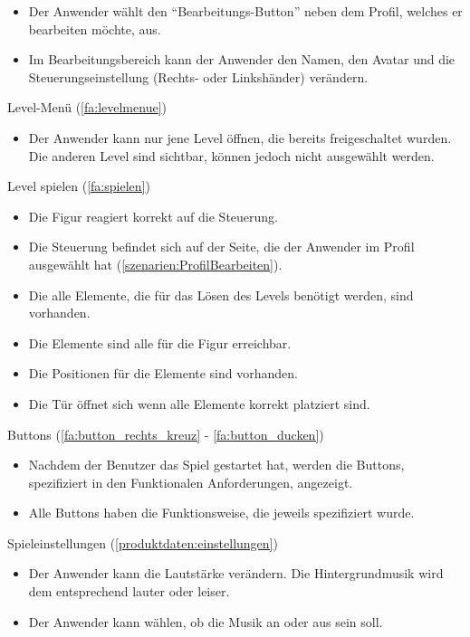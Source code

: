 \documentclass{scrartcl}
\begin{document}
\begin{telist}
\begin{itemize}
		\item Der Anwender wählt den \enquote{Bearbeitungs-Button} neben dem Profil, welches er bearbeiten möchte, aus.
		\item Im Bearbeitungsbereich kann der Anwender den Namen, den Avatar und die Steuerungseinstellung (Rechts- oder Linkshänder) verändern.
	\end{itemize}
	\item Level-Menü (\ref{fa:levelmenue})
	\begin{itemize}
		\item Der Anwender kann nur jene Level öffnen, die bereits freigeschaltet wurden. Die anderen Level sind sichtbar, können jedoch nicht ausgewählt werden.
	\end{itemize}
	\item Level spielen (\ref{fa:spielen})
	\begin{itemize}
		\item Die Figur reagiert korrekt auf die Steuerung.
		\item Die Steuerung befindet sich auf der Seite, die der Anwender im Profil ausgewählt hat (\ref{szenarien:ProfilBearbeiten}).
		\item Die alle Elemente, die für das Lösen des Levels benötigt werden, sind vorhanden.
		\item Die Elemente sind alle für die Figur erreichbar.
		\item Die Positionen für die Elemente sind vorhanden.
		\item Die Tür öffnet sich wenn alle Elemente korrekt platziert sind.
	\end{itemize}
	\item Buttons (\ref{fa:button_rechts_kreuz} - \ref{fa:button_ducken})
	\begin{itemize}
		\item Nachdem der Benutzer das Spiel gestartet hat, werden die Buttons, spezifiziert in den Funktionalen Anforderungen, angezeigt.
		\item Alle Buttons haben die Funktionsweise, die jeweils spezifiziert wurde.
	\end{itemize}
	\item Spieleinstellungen (\ref{produktdaten:einstellungen})
	\begin{itemize}
		\item Der Anwender kann die Lautstärke verändern. Die Hintergrundmusik wird dem entsprechend lauter oder leiser.
		\item Der Anwender kann wählen, ob die Musik an oder aus sein soll.

\end{itemize}
\end{telist}
\end{document}
